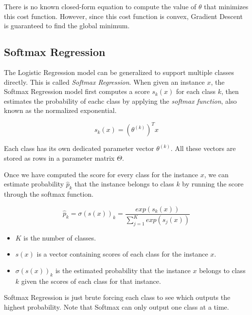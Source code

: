 \documentclass[letterpaper]{article}
\begin{document}
There is no known closed-form equation to compute the value of $\theta$ that minimizes this cost function. However, since this cost function is convex, Gradient Descent is guaranteed to find the global minimum. 

\subsection{Softmax Regression}
The Logistic Regression model can be generalized to support multiple classes directly. This is called \textsl{Softmax Regression}. When given an instance $x$, the Softmax Regression model first computes a score $s_{k}(x)$ for each class $k$, then estimates the probability of eachc class by applying the \textsl{softmax function}, also known as the normalized exponential. 

$$ s_{k}(x) = (\theta^{(k)})^{T}x $$

Each class has its own dedicated parameter vector $\theta^{(k)}$. All these vectors are stored as rows in a parameter matrix $\Theta$. 

Once we have computed the score for every class for the instance $x$, we can estimate probability $\hat{p}_{k}$ that the instance belongs to class $k$ by running the score through the softmax function. 

$$ \hat{p}_{k} = \sigma(s(x))_{k} = \frac{exp(s_{k}(x))}{\sum_{j=1}^{K} exp (s_{j}(x))} $$

\begin{itemize}
	\item $K$ is the number of classes. 
	\item $s(x)$ is a vector containing scores of each class for the instance $x$. 
	\item $\sigma(s(x))_k$ is the estimated probability that the instance $x$ belongs to class $k$ given the scores of each class for that instance. 
\end{itemize}

Softmax Regression is just brute forcing each class to see which outputs the highest probability. Note that Softmax can only output one class at a time. 
\end{document}
